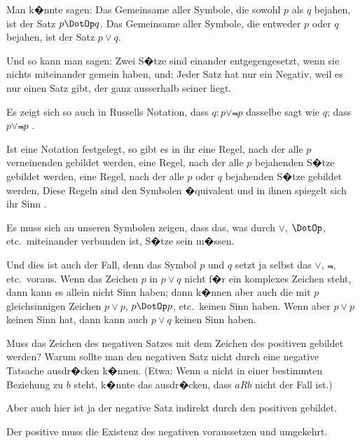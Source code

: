 \begin{propositions}
{Man k�nnte sagen: Das Gemeinsame aller Symbole,
die sowohl $p$ als $q$ bejahen, ist der Satz
\glqq{}$p \DotOp q$\grqq{}. Das Gemeinsame aller Symbole, die
entweder $p$ oder $q$ bejahen, ist der Satz \glqq{}$p \lor q$\grqq{}.

Und so kann man sagen: Zwei S�tze sind
einander entgegengesetzt, wenn sie nichts miteinander
gemein haben, und: Jeder Satz hat nur ein
Negativ, weil es nur einen Satz gibt, der ganz
ausserhalb seiner liegt.

Es zeigt sich so auch in Russells Notation, dass
\glqq{}$q : p \lor \Not{p}$\grqq{} dasselbe sagt wie \glqq{}$q$\grqq{}; dass \glqq{}$p \lor \Not{p}$\grqq{}
.}


{Ist eine Notation festgelegt, so gibt es in ihr eine
Regel, nach der alle $p$ verneinenden  gebildet
werden, eine Regel, nach der alle $p$ bejahenden
S�tze gebildet werden, eine Regel, nach der alle
$p$ oder $q$ bejahenden S�tze gebildet werden, \undSoFort{}
Diese Regeln sind den Symbolen �quivalent
und in ihnen spiegelt sich ihr Sinn .}


{Es muss sich an unseren Symbolen zeigen, dass
das, was durch \glqq{}$\lor$\grqq{}, \glqq{}$\DotOp$\grqq{}, etc.\ miteinander verbunden
ist, S�tze sein m�ssen.

Und dies ist auch der Fall, denn das Symbol \glqq{}$p$\grqq{}
und \glqq{}$q$\grqq{} setzt ja selbst das \glqq{}$\lor$\grqq{}, \glqq{}$\Not{}$\grqq{}, etc.\ voraus.
Wenn das Zeichen \glqq{}$p$\grqq{} in \glqq{}$p \lor q$\grqq{} nicht f�r ein komplexes
Zeichen steht, dann kann es allein nicht
Sinn haben; dann k�nnen aber auch die mit \glqq{}$p$\grqq{}
gleichsinnigen Zeichen \glqq{}$p \lor p$\grqq{}, \glqq{}$p \DotOp p$\grqq{}, etc.\ keinen
Sinn haben. Wenn aber \glqq{}$p \lor p$\grqq{} keinen Sinn hat,
dann kann auch \glqq{}$p \lor q$\grqq{} keinen Sinn haben.}


{Muss das Zeichen des negativen Satzes mit dem
Zeichen des positiven gebildet werden? Warum
sollte man den negativen Satz nicht durch eine negative
Tatsache ausdr�cken k�nnen. (Etwa: Wenn
\glqq{}$a$\grqq{} nicht in einer bestimmten Beziehung zu \glqq{}$b$\grqq{} steht,
k�nnte das ausdr�cken, dass $aRb$ nicht der Fall ist.)

Aber auch hier ist ja der negative Satz indirekt
durch den positiven gebildet.

Der positive  muss die Existenz des negativen
 voraussetzen und umgekehrt.}



\end{propositions}
